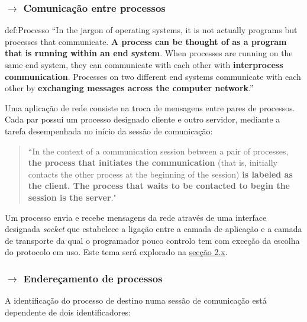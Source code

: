 \subsubsection[2.1.3 Comunicação entre processos ]{$\pmb{\rightarrow}$ Comunicação entre processos}

\begin{theo}{def:Processo}\label{def:Processo}
    ``In the jargon of operating systems, it is not actually programs but processes that
communicate. \textbf{A process can be thought of as a program that is running within an end
system}. When processes are running on the same end system, they can communicate
with each other with \textbf{interprocess communication}. Processes on two different end systems communicate with each other by \textbf{exchanging messages across the computer network}.''\cite{Kurose2017}
\end{theo}

\noindent Uma aplicação de rede consiste na troca de mensagens entre pares de processos. Cada par possui um processo designado cliente e outro servidor, mediante a tarefa desempenhada no início da sessão de comunicação:

\begin{quote}
    ``In the context of a communication session between a pair of processes, \textbf{the process that initiates the communication} (that is, initially contacts the other process at the beginning of the session) \textbf{is labeled as the client. The process that waits to be contacted to begin the session is the server}."
\end{quote}

\noindent Um processo envia e recebe mensagens da rede através de uma interface designada \textit{socket} que estabelece a ligação entre a camada de aplicação e a camada de transporte da qual o programador pouco controlo tem com exceção da escolha do protocolo em uso. Este tema será explorado na \hyperref[subsec:socket-programming]{secção 2.x}.

\subsubsection[2.1.4 Endereçamento de processos ]{$\pmb{\rightarrow}$ Endereçamento de processos}

A identificação do processo de destino numa sessão de comunicação está dependente de dois identificadores:

